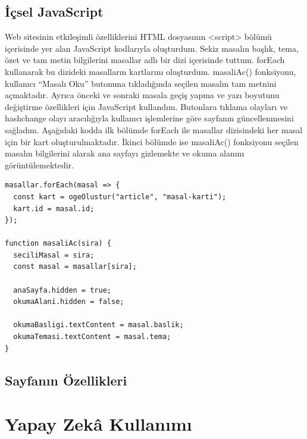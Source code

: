 \documentclass[12pt,a4paper]{article}
\begin{document}
\subsection{İçsel JavaScript}
Web sitesinin etkileşimli özelliklerini HTML dosyasının <script> bölümü içerisinde yer alan JavaScript kodlarıyla oluşturdum. Sekiz masalın başlık, tema, özet ve tam metin bilgilerini masallar adlı bir dizi içerisinde tuttum. forEach kullanarak bu dizideki masalların kartlarını oluşturdum. masaliAc() fonksiyonu, kullanıcı “Masalı Oku” butonuna tıkladığında seçilen masalın tam metnini açmaktadır. Ayrıca önceki ve sonraki masala geçiş yapma ve yazı boyutunu değiştirme özellikleri için JavaScript kullandım. Butonlara tıklama olayları ve hashchange olayı aracılığıyla kullanıcı işlemlerine göre sayfanın güncellenmesini sağladım. Aşağıdaki kodda ilk bölümde forEach ile masallar dizisindeki her masal için bir kart oluşturulmaktadır. İkinci bölümde ise masaliAc() fonksiyonu seçilen masalın bilgilerini alarak ana sayfayı gizlemekte ve okuma alanını görüntülemektedir.

\begin{lstlisting}[caption={İçsel JavaScript'ten önemli bir bölüm}]
masallar.forEach(masal => {
  const kart = ogeOlustur("article", "masal-karti");
  kart.id = masal.id;
});

function masaliAc(sira) {
  seciliMasal = sira;
  const masal = masallar[sira];

  anaSayfa.hidden = true;
  okumaAlani.hidden = false;

  okumaBasligi.textContent = masal.baslik;
  okumaTemasi.textContent = masal.tema;
}
\end{lstlisting}

\subsection{Sayfanın Özellikleri}


\section{Yapay Zekâ Kullanımı}
\end{document}
